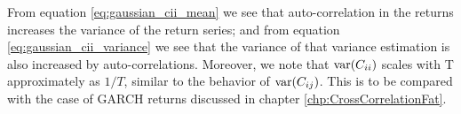 From equation \ref{eq:gaussian_cii_mean} we see that auto-correlation
in the returns increases the variance of the return series; and from
equation \ref{eq:gaussian_cii_variance} we see that the variance of
that variance estimation is also increased by
auto-correlations. Moreover, we note that $\text{var}(C_{ii})$ scales with T
approximately as $1/T$, similar to the behavior of
$\text{var}(C_{ij})$. This is to be compared with the case of GARCH returns
discussed in chapter \ref{chp:CrossCorrelationFat}.





